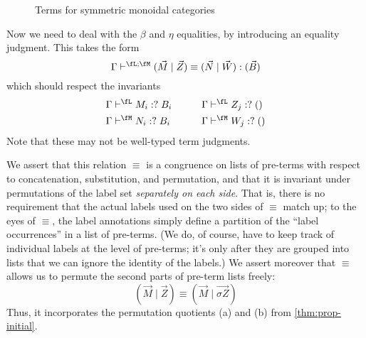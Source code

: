 \documentclass{book}
\let\types\vdash
\newcommand{\pc}{\mathrel{\mathord{:}?}}
\def\ttt{\mathsf{tt}}
\def\pair#1#2{\langle #1,#2\rangle}
\def\one{\mathbf{1}}
\let\tensor\otimes
\def\tensorI{\mathord{\tensor}I}
\def\tensorE{\mathord{\tensor}E}
\begin{document}
\begin{figure}
  \centering
  \caption{Terms for symmetric monoidal categories}
  \label{fig:prop-smc-terms}
\end{figure}

Now we need to deal with the $\beta$ and $\eta$ equalities, by introducing an equality judgment.
This takes the form
\[\Gamma \types^{\fL;\fM} (\vec M\mid\vec Z)\equiv (\vec N\mid\vec W) :(\vec B)\]
which should respect the invariants
\begin{alignat*}{2}
  \Gamma&\types^{\fL} M_i\pc B_i &\qquad
  \Gamma&\types^{\fL} Z_j\pc ()\\
  \Gamma&\types^{\fM} N_i\pc B_i &\qquad
  \Gamma&\types^{\fM} W_j\pc ()
\end{alignat*}
Note that these may not be well-typed term judgments.

We assert that this relation $\equiv$ is a congruence on lists of pre-terms with respect to concatenation, substitution, and permutation, and that it is invariant under permutations of the label set \fA \emph{separately on each side}.
That is, there is no requirement that the actual labels used on the two sides of $\equiv$ match up; to the eyes of $\equiv$, the label annotations simply define a partition of the ``label occurrences'' in a list of pre-terms.
(We do, of course, have to keep track of individual labels at the level of pre-terms; it's only after they are grouped into lists that we can ignore the identity of the labels.)
We assert moreover that $\equiv$ allows us to permute the second parts of pre-term lists freely:
\[ (\vec M \mid \vec{Z}) \equiv (\vec M \mid \vec{\sigma Z})\]
Thus, it incorporates the permutation quotients (a) and (b) from \cref{thm:prop-initial}.
\end{document}

